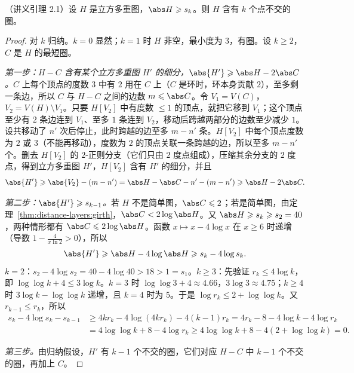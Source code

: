 \begin{lemma}\label{lem:packing:cubic}
（讲义引理 2.1）设 $H$ 是立方多重图，$\abs H\geqslant s_k$。则 $H$ 含有 $k$ 个点不交的圈。
\end{lemma}
\begin{proof}
对 $k$ 归纳。$k=0$ 显然；$k=1$ 时 $H$ 非空，最小度为 $3$，有圈。设 $k\geqslant2$，$C$ 是 $H$ 的最短圈。

\emph{第一步：$H-C$ 含有某个立方多重图 $H'$ 的细分，$\abs{H'}\geqslant\abs H-2\abs C$。}$C$ 上每个顶点的度数 $3$ 中有 $2$ 用在 $C$ 上（$C$ 是环时，环本身贡献 $2$），至多剩一条边，所以 $C$ 与 $H-C$ 之间的边数 $m\leqslant\abs C$。令 $V_1=V(C)$，$V_2=V(H)\setminus V_1$。只要 $H[V_2]$ 中有度数 $\leqslant1$ 的顶点，就把它移到 $V_1$；这个顶点至少有 $2$ 条边连到 $V_1$、至多 $1$ 条连到 $V_2$，移动后跨越两部分的边数至少减少 $1$。设共移动了 $n'$ 次后停止，此时跨越的边至多 $m-n'$ 条。$H[V_2]$ 中每个顶点度数为 $2$ 或 $3$（不能再移动），度数为 $2$ 的顶点关联一条跨越的边，所以至多 $m-n'$ 个。删去 $H[V_2]$ 的 $2$-正则分支（它们只由 $2$ 度点组成），压缩其余分支的 $2$ 度点，得到立方多重图 $H'$，$H[V_2]$ 含有 $H'$ 的细分，并且
\[
\abs{H'}\geqslant\abs{V_2}-(m-n')=\abs H-\abs C-n'-(m-n')\geqslant\abs H-2\abs C .
\]

\emph{第二步：$\abs{H'}\geqslant s_{k-1}$。}若 $H$ 不是简单图，$\abs C\leqslant2$；若是简单图，由定理~\ref{thm:distance-layers:girth}，$\abs C<2\log\abs H$。又 $\abs H\geqslant s_k\geqslant s_2=40$，两种情形都有 $\abs C\leqslant2\log\abs H$。函数 $x\mapsto x-4\log x$ 在 $x\geqslant6$ 时递增（导数 $1-\frac4{x\ln2}>0$），所以
\[
\abs{H'}\geqslant\abs H-4\log\abs H\geqslant s_k-4\log s_k .
\]
$k=2$：$s_2-4\log s_2=40-4\log40>18>1=s_1$。$k\geqslant3$：先验证 $r_k\leqslant4\log k$，即 $\log\log k+4\leqslant3\log k$。$k=3$ 时 $\log\log3+4\approx4.66$，$3\log3\approx4.75$；$k\geqslant4$ 时 $3\log k-\log\log k$ 递增，且 $k=4$ 时为 $5$。于是 $\log r_k\leqslant2+\log\log k$。又 $r_{k-1}\leqslant r_k$，所以
\[
\begin{aligned}
s_k-4\log s_k-s_{k-1}&\geqslant4kr_k-4\log(4kr_k)-4(k-1)r_k=4r_k-8-4\log k-4\log r_k\\
&=4\log\log k+8-4\log r_k\geqslant4\log\log k+8-4(2+\log\log k)=0 .
\end{aligned}
\]

\emph{第三步。}由归纳假设，$H'$ 有 $k-1$ 个不交的圈，它们对应 $H-C$ 中 $k-1$ 个不交的圈，再加上 $C$。
\end{proof}

